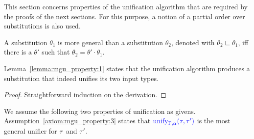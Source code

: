 This section concerns properties of the unification algorithm that are required by the proofs of
the next sections. For this purpose, a notion of a partial order over substitutions is also
used.

\begin{definition}
A substitution $\theta_1$ is more general than a substitution $\theta_2$, denoted with
$\theta_2\sqsubseteq\theta_1$, iff there is a $\theta'$ such that $\theta_2 = \theta'\cdot\theta_1$.
\end{definition}

Lemma~\ref{lemma:mgu_property:1} states that the unification algorithm produces
a substitution that indeed unifies its two input types.\\

{\centering
{}}

\begin{proof}
Straightforward induction on the derivation.
\end{proof}

We assume the following two properties of unification as givens.\\

Assumption~\ref{axiom:mgu_property:3} states that ${\color{blue} \mathrm{unify}_{\Gamma;\bar{\alpha}}(\tau,\tau')}$ is the most general unifier for $\tau$ and $\tau'$.\\


